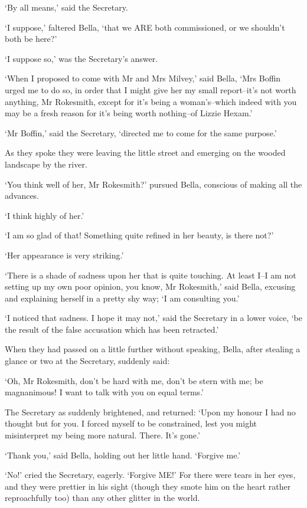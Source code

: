 ‘By all means,’ said the Secretary.

‘I suppose,’ faltered Bella, ‘that we ARE both commissioned, or we
shouldn’t both be here?’

‘I suppose so,’ was the Secretary’s answer.

‘When I proposed to come with Mr and Mrs Milvey,’ said Bella, ‘Mrs
Boffin urged me to do so, in order that I might give her my small
report--it’s not worth anything, Mr Rokesmith, except for it’s being
a woman’s--which indeed with you may be a fresh reason for it’s being
worth nothing--of Lizzie Hexam.’

‘Mr Boffin,’ said the Secretary, ‘directed me to come for the same
purpose.’

As they spoke they were leaving the little street and emerging on the
wooded landscape by the river.

‘You think well of her, Mr Rokesmith?’ pursued Bella, conscious of
making all the advances.

‘I think highly of her.’

‘I am so glad of that! Something quite refined in her beauty, is there
not?’

‘Her appearance is very striking.’

‘There is a shade of sadness upon her that is quite touching. At least
I--I am not setting up my own poor opinion, you know, Mr Rokesmith,’
said Bella, excusing and explaining herself in a pretty shy way; ‘I am
consulting you.’

‘I noticed that sadness. I hope it may not,’ said the Secretary in
a lower voice, ‘be the result of the false accusation which has been
retracted.’

When they had passed on a little further without speaking, Bella, after
stealing a glance or two at the Secretary, suddenly said:

‘Oh, Mr Rokesmith, don’t be hard with me, don’t be stern with me; be
magnanimous! I want to talk with you on equal terms.’

The Secretary as suddenly brightened, and returned: ‘Upon my honour I
had no thought but for you. I forced myself to be constrained, lest you
might misinterpret my being more natural. There. It’s gone.’

‘Thank you,’ said Bella, holding out her little hand. ‘Forgive me.’

‘No!’ cried the Secretary, eagerly. ‘Forgive ME!’ For there were tears
in her eyes, and they were prettier in his sight (though they smote him
on the heart rather reproachfully too) than any other glitter in the
world.

